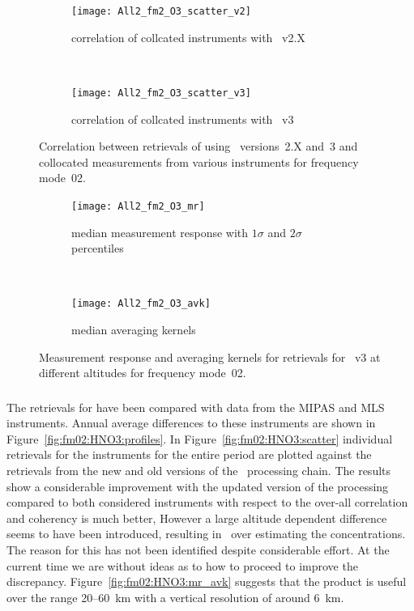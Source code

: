 \begin{figure}[tbhp]
    \centering
    \begin{subfigure}[b]{0.49\textwidth}
        \texttt{[image: All2\_fm2\_O3\_scatter\_v2]}
        \caption{correlation of collcated instruments with \smr~v2.X}
        \label{fig:fm02:O3:scatter:v2}
    \end{subfigure}
    \,
    \begin{subfigure}[b]{0.49\textwidth}
        \texttt{[image: All2\_fm2\_O3\_scatter\_v3]}
        \caption{correlation of collcated instruments with \smr~v3}
        \label{fig:fm02:O3:scatter:v3}
    \end{subfigure}
    \caption{Correlation between retrievals of  using \smr\
    versions~2.X and~3 and collocated measurements from various instruments
    for frequency mode~02.}
    \label{fig:fm02:O3:scatter}
\end{figure}

\begin{figure}[tbhp]
    \centering
    \begin{subfigure}[b]{0.49\textwidth}
        \texttt{[image: All2\_fm2\_O3\_mr]}
        \caption{median measurement response with $1\sigma$ and $2\sigma$
        percentiles}
        \label{fig:fm02:O3:mr}
    \end{subfigure}
    \,
    \begin{subfigure}[b]{0.49\textwidth}
        \texttt{[image: All2\_fm2\_O3\_avk]}
        \caption{median averaging kernels\newline~}
        \label{fig:fm02:O3:avk}
    \end{subfigure}
    \caption{Measurement response and averaging kernels for 
    retrievals for \smr~v3 at different altitudes for frequency mode~02.}
    \label{fig:fm02:O3:mr_avk}
\end{figure}



\subsubsection{}
\label{sec:fm02:comparison:HNO3} The retrievals for  have been
compared with data from the MIPAS and MLS instruments. Annual average
differences to these instruments are shown in
Figure~\ref{fig:fm02:HNO3:profiles}. In Figure~\ref{fig:fm02:HNO3:scatter}
individual retrievals for the instruments for the entire period are plotted
against the retrievals from the new and old versions of the \smr\ processing
chain. The results show a considerable improvement with the updated version of
the processing compared to both considered instruments with respect to the
over-all correlation and coherency is much better, However a large altitude
dependent difference seems to have been introduced, resulting in \smr\ over
estimating the concentrations. The reason for this has not been identified despite considerable 
effort. At the current time we are without ideas as to how to proceed to improve the discrepancy.
Figure~\ref{fig:fm02:HNO3:mr_avk} suggests that the product is useful over the
range 20--60~km with a vertical resolution of around 6~km.

